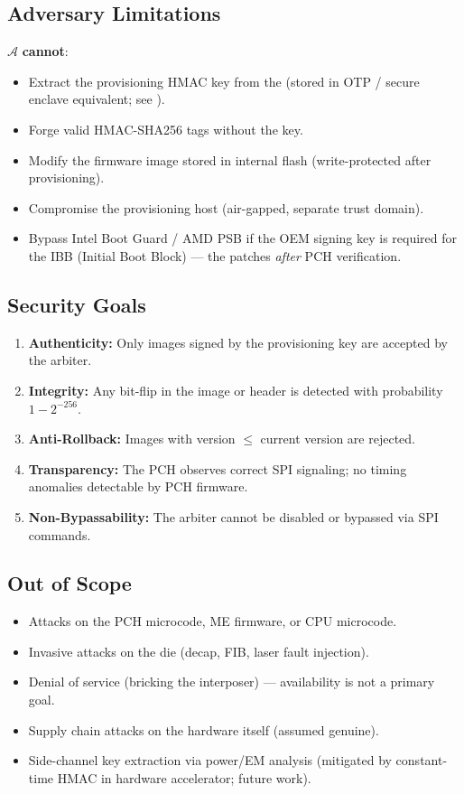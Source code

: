 \subsection{Adversary Limitations}
$\mathcal{A}$ \textbf{cannot}:
\begin{itemize}
    \item Extract the provisioning \ac{HMAC} key from the \rp (stored in \ac{OTP} / secure enclave equivalent; see ).
    \item Forge valid \ac{HMAC}-\ac{SHA}256 tags without the key.
    \item Modify the \rp firmware image stored in internal flash (write-protected after provisioning).
    \item Compromise the provisioning host (air-gapped, separate trust domain).
    \item Bypass Intel Boot Guard / AMD PSB if the OEM signing key is required for the \ac{IBB} (Initial Boot Block) — the \vbfc patches \textit{after} \ac{PCH} verification.
\end{itemize}

\subsection{Security Goals}
\begin{enumerate}
    \item \textbf{Authenticity:} Only images signed by the provisioning key are accepted by the \vbfc arbiter.
    \item \textbf{Integrity:} Any bit-flip in the image or header is detected with probability $1 - 2^{-256}$.
    \item \textbf{Anti-Rollback:} Images with version $\le$ current version are rejected.
    \item \textbf{Transparency:} The \ac{PCH} observes correct \ac{SPI} signaling; no timing anomalies detectable by \ac{PCH} firmware.
    \item \textbf{Non-Bypassability:} The arbiter cannot be disabled or bypassed via \ac{SPI} commands.
\end{enumerate}

\subsection{Out of Scope}
\begin{itemize}
    \item Attacks on the \ac{PCH} microcode, \ac{ME} firmware, or CPU microcode.
    \item Invasive attacks on the \rp die (decap, FIB, laser fault injection).
    \item Denial of service (bricking the interposer) — availability is not a primary goal.
    \item Supply chain attacks on the \vbfc hardware itself (assumed genuine).
    \item Side-channel key extraction via power/EM analysis (mitigated by constant-time \ac{HMAC} in hardware accelerator; future work).
\end{itemize}